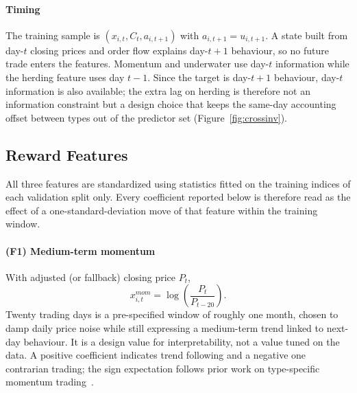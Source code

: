 \paragraph{Timing}
The training sample is $(x_{i,t},C_t,a_{i,t+1})$ with $a_{i,t+1}=u_{i,t+1}$. A
state built from day-$t$ closing prices and order flow explains day-$t+1$
behaviour, so no future trade enters the features. Momentum and underwater use
day-$t$ information while the herding feature uses day $t-1$. Since the target
is day-$t+1$ behaviour, day-$t$ information is also available; the extra lag on
herding is therefore not an information constraint but a design choice that
keeps the same-day accounting offset between types out of the predictor set
(Figure~\ref{fig:crossinv}).

\subsection{Reward Features}
\label{sec:features}

All three features are standardized using statistics fitted on the training
indices of each validation split only. Every coefficient reported below is
therefore read as the effect of a one-standard-deviation move of that feature
within the training window.

\paragraph{(F1) Medium-term momentum}
With adjusted (or fallback) closing price $P_t$,
\begin{equation}
x^{mom}_{i,t}=\log\!\left(\frac{P_t}{P_{t-20}}\right).
\label{eq:momentum}
\end{equation}
Twenty trading days is a pre-specified window of roughly one month, chosen to
damp daily price noise while still expressing a medium-term trend linked to
next-day behaviour. It is a design value for interpretability, not a value tuned
on the data. A positive coefficient indicates trend following and a negative one
contrarian trading; the sign expectation follows prior work on type-specific
momentum trading~\cite{grinblatt2000investment,choe1999foreign}.

